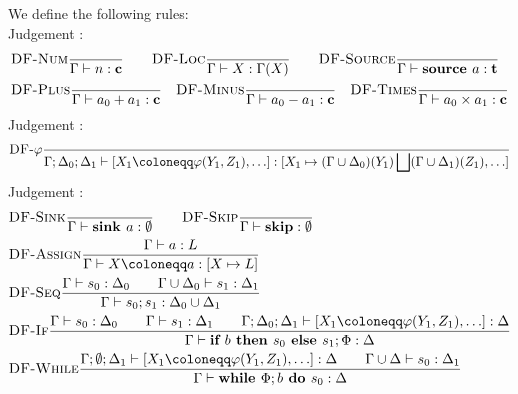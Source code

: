 We define the following rules:\\
Judgement :
\begin{align*}
    &\rule{DF-Num}{}{\typestep{\Gamma}{n}{\lclean}}\qquad
    \rule{DF-Loc}{}{\typestep{\Gamma}{X}{\Gamma(X)}}\qquad%
    \rule{DF-Source}{}{\typestep{\Gamma}{\source{a}}{\ltracked}}\\
    &\rule{DF-Plus}{}{\typestep{\Gamma}{a_0+a_1}{\lclean}}\quad
    \rule{DF-Minus}{}{\typestep{\Gamma}{a_0-a_1}{\lclean}}\quad
    \rule{DF-Times}{}{\typestep{\Gamma}{a_0 \times a_1}{\lclean}}
\end{align*}
Judgement :
\begin{align*}
    &\rule{DF-$\varphi$}{}{\typestep{\Gamma;\Delta_0;\Delta_1}{\defaultphilist}
    {[X_1 \mapsto (\Gamma \union \Delta_0)(Y_1) \join (\Gamma \union \Delta_1)(Z_1), \ldots]}}\\
\end{align*}
Judgement :
\begin{align*}
    &\rule{DF-Sink}{}{\typestep{\Gamma}{\sink{a}}{\emptyset}}\qquad
    \rule{DF-Skip}{}{\typestep{\Gamma}{\skipcmd}{\emptyset}}\\
    &\rule{DF-Assign}{\typestep{\Gamma}{a}{L}}{\typestep{\Gamma}{\defaultstore}{[X \mapsto L]}}\\%
    &\rule{DF-Seq}{\typestep{\Gamma}{s_0}{\Delta_0}\qquad
    \typestep{\Gamma \cup \Delta_0}{s_1}{\Delta_1}}{\typestep{\Gamma}{\defaultssaseq}{\Delta_0 \cup \Delta_1}}\\
    &\rule{DF-If}{\typestep{\Gamma}{s_0}{\Delta_0}\qquad \typestep{\Gamma}{s_1}{\Delta_1}\qquad
    \typestep{\Gamma;\Delta_0;\Delta_1}{\defaultphilist}{\Delta}}
    {\typestep{\Gamma}{\defaultssaif}{\Delta}}\\
    &\rule{DF-While}{\typestep{\Gamma;\emptyset;\Delta_1}{\defaultphilist}{\Delta}\qquad
    \typestep{\Gamma \cup \Delta}{s_0}{\Delta_1}}
    {\typestep{\Gamma}{\defaultssawhile}{\Delta}}
\end{align*}



\iffalse
